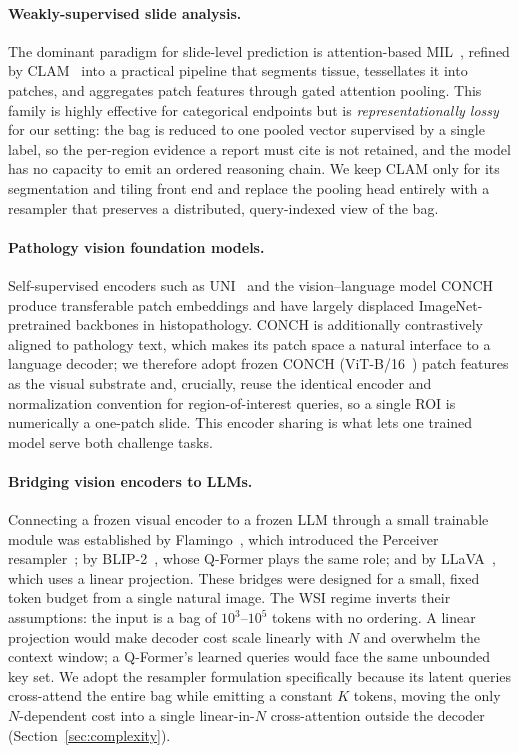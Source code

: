 \documentclass[11pt]{article}
\begin{document}
\paragraph{Weakly-supervised slide analysis.} The dominant paradigm for
slide-level prediction is attention-based MIL~\cite{ilse2018attention}, refined by
CLAM~\cite{lu2021clam} into a practical pipeline that segments tissue, tessellates
it into patches, and aggregates patch features through gated attention pooling.
This family is highly effective for categorical endpoints but is
\emph{representationally lossy} for our setting: the bag is reduced to one pooled
vector supervised by a single label, so the per-region evidence a report must
cite is not retained, and the model has no capacity to emit an ordered reasoning
chain. We keep CLAM only for its segmentation and tiling front end and replace the
pooling head entirely with a resampler that preserves a distributed, query-indexed
view of the bag.

\paragraph{Pathology vision foundation models.} Self-supervised encoders such as
UNI~\cite{chen2024uni} and the vision--language model CONCH~\cite{lu2024conch}
produce transferable patch embeddings and have largely displaced ImageNet-pretrained
backbones in histopathology. CONCH is additionally contrastively aligned to
pathology text, which makes its patch space a natural interface to a language
decoder; we therefore adopt frozen CONCH (ViT-B/16~\cite{dosovitskiy2021vit})
patch features as the visual substrate and, crucially, reuse the identical encoder
and normalization convention for region-of-interest queries, so a single ROI is
numerically a one-patch slide. This encoder sharing is what lets one trained model
serve both challenge tasks.

\paragraph{Bridging vision encoders to LLMs.} Connecting a frozen visual encoder
to a frozen LLM through a small trainable module was established by
Flamingo~\cite{alayrac2022flamingo}, which introduced the Perceiver
resampler~\cite{jaegle2021perceiver}; by BLIP-2~\cite{li2023blip2}, whose Q-Former
plays the same role; and by LLaVA~\cite{liu2023llava}, which uses a linear
projection. These bridges were designed for a small, fixed token budget from a
single natural image. The WSI regime inverts their assumptions: the input is a bag
of $10^3$--$10^5$ tokens with no ordering. A linear projection would make decoder
cost scale linearly with $N$ and overwhelm the context window; a Q-Former's
learned queries would face the same unbounded key set. We adopt the resampler
formulation specifically because its latent queries cross-attend the entire bag
while emitting a constant $K$ tokens, moving the only $N$-dependent cost into a
single linear-in-$N$ cross-attention outside the decoder (Section~\ref{sec:complexity}).
\end{document}
